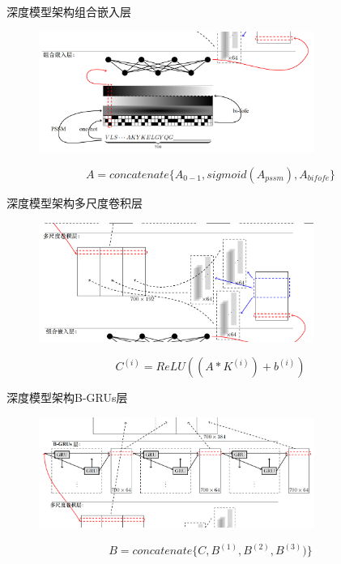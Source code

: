 \documentclass[table]{beamer}
\begin{document}
\begin{frame}{深度模型架构}{组合嵌入层}
\begin{figure}
	\centering
	\includegraphics[width=0.8\textwidth]{pic/pptlayer0}
\end{figure}
\begin{equation}
	A = concatenate\{A_{0-1},sigmoid(A_{pssm}),A_{bifofe}\}
\end{equation}
\end{frame}

\begin{frame}{深度模型架构}{多尺度卷积层}
\begin{figure}
	\centering
	\includegraphics[width=0.8\textwidth]{pic/pptlayer1}
\end{figure}
\begin{equation}
	C^{(i)} = ReLU((A*K^{(i)})+b^{(i)})
\end{equation}
\end{frame}

\begin{frame}{深度模型架构}{B-GRUs层}
\begin{figure}
	\centering
	\includegraphics[width=0.8\textwidth]{pic/pptlayer2}
\end{figure}
\begin{equation}
	B = concatenate\{C,B^{(1)},B^{(2)},B^{(3)})\}
\end{equation}
\end{frame}
\end{document}
